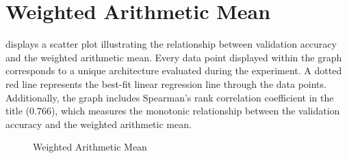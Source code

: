 \section{Weighted Arithmetic Mean}
\label{sec:r_wam}
 displays a scatter plot illustrating the relationship between validation accuracy and the weighted arithmetic mean. Every data point displayed within the graph corresponds to a unique architecture evaluated during the experiment. A dotted red line represents the best-fit linear regression line through the data points. Additionally, the graph includes Spearman's rank correlation coefficient in the title ($0.766$), which measures the monotonic relationship between the validation accuracy and the weighted arithmetic mean. 

\begin{figure}[h!]
  \centering
  
  \caption{Weighted Arithmetic Mean}
  \label{fig:weighted}
\end{figure}